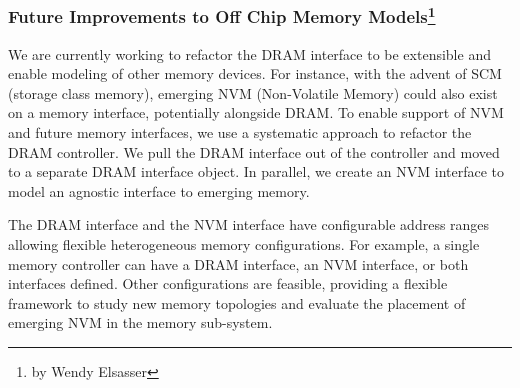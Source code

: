 \subsubsection[Future Improvements to Off Chip Memory Models]{Future Improvements to Off Chip Memory Models\footnote{by Wendy Elsasser}}
\label{sec:nvm}

We are currently working to refactor the DRAM interface to be extensible and enable modeling of other memory devices.
For instance, with the advent of SCM (storage class memory), emerging NVM (Non-Volatile Memory) could also exist on a memory interface, potentially alongside DRAM.
To enable support of NVM and future memory interfaces, we use a systematic approach to refactor the DRAM controller.
We pull the DRAM interface out of the controller and moved to a separate DRAM interface object.
In parallel, we create an NVM interface to model an agnostic interface to emerging memory.

The DRAM interface and the NVM interface have configurable address ranges allowing flexible heterogeneous memory configurations.
For example, a single memory controller can have a DRAM interface, an NVM interface, or both interfaces defined.
Other configurations are feasible, providing a flexible framework to study new memory topologies and evaluate the placement of emerging NVM in the memory sub-system.
